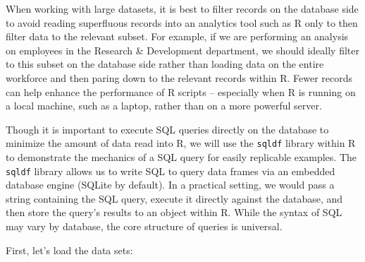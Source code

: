 \documentclass[
]{book}
\begin{document}
When working with large datasets, it is best to filter records on the database side to avoid reading superfluous records into an analytics tool such as R only to then filter data to the relevant subset. For example, if we are performing an analysis on employees in the Research \& Development department, we should ideally filter to this subset on the database side rather than loading data on the entire workforce and then paring down to the relevant records within R. Fewer records can help enhance the performance of R scripts -- especially when R is running on a local machine, such as a laptop, rather than on a more powerful server.

Though it is important to execute SQL queries directly on the database to minimize the amount of data read into R, we will use the \texttt{sqldf} library within R to demonstrate the mechanics of a SQL query for easily replicable examples. The \texttt{sqldf} library allows us to write SQL to query data frames via an embedded database engine (SQLite by default). In a practical setting, we would pass a string containing the SQL query, execute it directly against the database, and then store the query's results to an object within R. While the syntax of SQL may vary by database, the core structure of queries is universal.

First, let's load the data sets:
\end{document}
